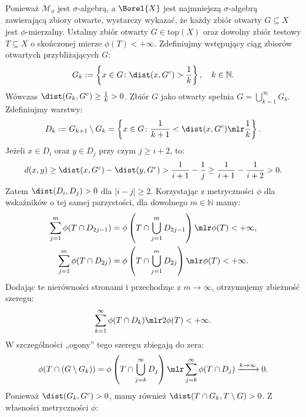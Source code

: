 \begin{dow} Ponieważ $\mathcal{M}_\phi$ jest $\sigma$-algebrą, a $\Borel{X}$ jest najmniejszą $\sigma$-algebrą zawierającą zbiory otwarte, wystarczy wykazać, że każdy zbiór otwarty $G \subseteq X$ jest $\phi$-mierzalny. Ustalmy zbiór otwarty $G \in \mathrm{top}(X)$ oraz dowolny zbiór testowy $T \subseteq X$ o skończonej mierze $\phi(T) < +\infty$. Zdefiniujmy wstępujący ciąg zbiorów otwartych przybliżających $G$:
    \begin{equation*}
        G_k := \left\{x \in G \colon \dist(x, G^c) > \frac{1}{k}\right\}, \quad k \in \mathbb{N}.
    \end{equation*}
    Wówczas $\dist(G_k, G^c) \ge \frac{1}{k} > 0$. Zbiór $G$ jako otwarty spełnia $G = \bigcup_{k=1}^\infty G_k$. Zdefiniujmy warstwy: \begin{equation*} D_k := G_{k+1} \setminus G_k = \left\{x \in G \colon \frac{1}{k+1} < \dist(x, G^c) \mlr \frac{1}{k}\right\}.
    \end{equation*}
    Jeżeli $x \in D_i$ oraz $y \in D_j$ przy czym $j \ge i + 2$, to: \begin{equation*}
        d(x, y) \ge \dist(x, G^c) - \dist(y, G^c) > \frac{1}{i+1} - \frac{1}{j} \ge \frac{1}{i+1} - \frac{1}{i+2} > 0.
    \end{equation*}
    Zatem $\dist(D_i, D_j) > 0$ dla $|i - j| \ge 2$. Korzystając z metryczności $\phi$ dla wskaźników o tej samej parzystości, dla dowolnego $m \in \mathbb{N}$ mamy: \begin{align} \sum_{j=1}^m \phi(T \cap D_{2j-1}) &= \phi\left(T \cap \bigcup_{j=1}^m D_{2j-1}\right) \mlr \phi(T) < +\infty, \\ \sum_{j=1}^m \phi(T \cap D_{2j}) &= \phi\left(T \cap \bigcup_{j=1}^m D_{2j}\right) \mlr \phi(T) < +\infty. \end{align} Dodając te nierówności stronami i przechodząc z $m \to \infty$, otrzymujemy zbieżność szeregu: \begin{equation*}
        \sum_{k=1}^\infty \phi(T \cap D_k) \mlr 2\phi(T) < +\infty.
    \end{equation*}
    W szczególności „ogony” tego szeregu zbiegają do zera:
    \begin{equation*} \phi(T \cap (G \setminus G_k)) = \phi\left(T \cap \bigcup_{j=k}^\infty D_j\right) \mlr \sum_{j=k}^\infty \phi(T \cap D_j) \xrightarrow{k \to \infty} 0.
    \end{equation*}
    Ponieważ $\dist(G_k, G^c) > 0$, mamy również $\dist(T \cap G_k, T \setminus G) > 0$. Z własności metryczności $\phi$:

\end{dow}
